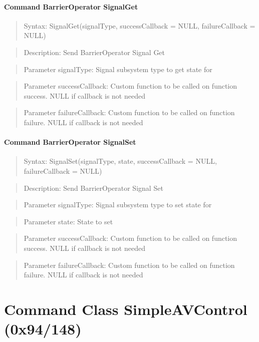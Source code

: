 \paragraph{Command BarrierOperator SignalGet}
\begin{quote}Syntax: SignalGet(signalType, successCallback = NULL, failureCallback = NULL)\end{quote}
\begin{quote}Description: Send BarrierOperator Signal Get\end{quote}
\begin{quote}Parameter signalType: Signal subsystem type to get state for\end{quote}
\begin{quote}Parameter successCallback: Custom function to be called on function success. NULL if callback is not needed\end{quote}
\begin{quote}Parameter failureCallback: Custom function to be called on function failure. NULL if callback is not needed\end{quote}


\paragraph{Command BarrierOperator SignalSet}
\begin{quote}Syntax: SignalSet(signalType, state, successCallback = NULL, failureCallback = NULL)\end{quote}
\begin{quote}Description: Send BarrierOperator Signal Set\end{quote}
\begin{quote}Parameter signalType: Signal subsystem type to set state for\end{quote}
\begin{quote}Parameter state: State to set\end{quote}
\begin{quote}Parameter successCallback: Custom function to be called on function success. NULL if callback is not needed\end{quote}
\begin{quote}Parameter failureCallback: Custom function to be called on function failure. NULL if callback is not needed\end{quote}



\section{Command Class SimpleAVControl (0x94/148)}


